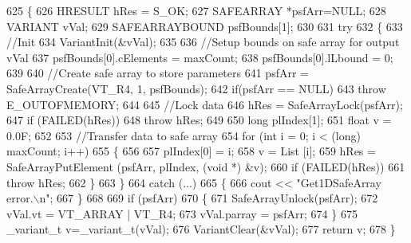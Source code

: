 \begin{DoxyCode}
625     \{
626         HRESULT hRes = S\_OK;
627         SAFEARRAY *psfArr=NULL;
628         VARIANT vVal;
629         SAFEARRAYBOUND psfBounds[1];
630 
631         \textcolor{keywordflow}{try}
632         \{
633             \textcolor{comment}{//Init}
634             VariantInit(&vVal);
635 
636             \textcolor{comment}{//Setup bounds on safe array for output vVal}
637             psfBounds[0].cElements = maxCount;
638             psfBounds[0].lLbound = 0;
639 
640             \textcolor{comment}{//Create safe array to store parameters}
641             psfArr = SafeArrayCreate(VT\_R4, 1, psfBounds);
642             \textcolor{keywordflow}{if}(psfArr == NULL) 
643                 \textcolor{keywordflow}{throw} E\_OUTOFMEMORY;
644 
645             \textcolor{comment}{//Lock data}
646             hRes = SafeArrayLock(psfArr);
647             \textcolor{keywordflow}{if} (FAILED(hRes)) 
648                 \textcolor{keywordflow}{throw} hRes;
649 
650             \textcolor{keywordtype}{long} plIndex[1];
651             \textcolor{keywordtype}{float} v = 0.0F;
652 
653             \textcolor{comment}{//Transfer data to safe array}
654             \textcolor{keywordflow}{for} (\textcolor{keywordtype}{int} i = 0; i < (long) maxCount; i++) 
655             \{
656                 
657                 plIndex[0] = i;
658                 v = List [i];
659                 hRes = SafeArrayPutElement (psfArr, plIndex, (\textcolor{keywordtype}{void} *) &v);
660                 \textcolor{keywordflow}{if} (FAILED(hRes)) 
661                     \textcolor{keywordflow}{throw} hRes;
662             \}
663         \}
664         \textcolor{keywordflow}{catch} (...)
665         \{
666             cout << \textcolor{stringliteral}{"Get1DSafeArray error.\(\backslash\)n"};
667         \}
668 
669         \textcolor{keywordflow}{if} (psfArr) 
670         \{
671             SafeArrayUnlock(psfArr);
672             vVal.vt = VT\_ARRAY | VT\_R4;
673             vVal.parray = psfArr;
674         \}
675         \_variant\_t v=\_variant\_t(vVal);
676         VariantClear(&vVal);
677         \textcolor{keywordflow}{return} v;
678     \}
\end{DoxyCode}
\mbox{\label{class_utilities_a63dff5c20c4c0e72d53a07b150ab1ab6_a63dff5c20c4c0e72d53a07b150ab1ab6}} 
